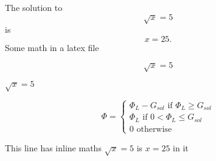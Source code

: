\documentclass{article}
\begin{document}
The solution to \[\sqrt{x} = 5\] is \[x=25.\]
Some math in a latex file


\[\sqrt{x} = 5\]

\(
\sqrt{x} = 5
\)

$$
\Phi = \begin{cases}
\Phi_L - G_{sol} \text{ if } \Phi_L \geq G_{sol}\\
\Phi_L \text{ if }  0 <\Phi_L \leq G_{sol}\\
0 \text{ otherwise }
\end{cases}
$$


This line has inline maths $\sqrt{x} = 5$ is $x=25$ in it
\end{document}
